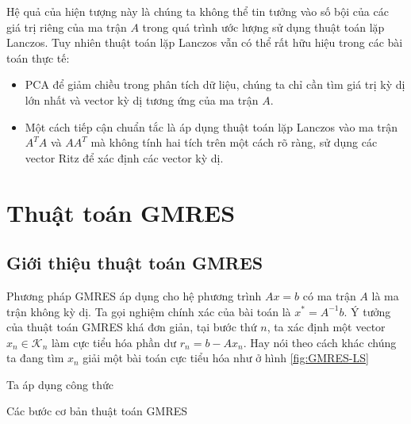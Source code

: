 \documentclass[14pt, a4paper]{article}
\numberwithin{equation}{section}
\numberwithin{algorithm}{section}
\numberwithin{figure}{section}
\numberwithin{dl}{section}
\numberwithin{md}{section}
\numberwithin{bd}{section}
\begin{document}
Hệ quả của hiện tượng này là chúng ta không thể tin tưởng vào số bội của các giá trị riêng của ma trận $A$ trong quá trình ước lượng sử dụng thuật toán lặp Lanczos.
Tuy nhiên thuật toán lặp Lanczos vẫn có thể rất hữu hiệu trong các bài toán thực tế:

\begin{itemize}
    \item PCA để giảm chiều trong phân tích dữ liệu, chúng ta chỉ cần tìm giá trị kỳ dị lớn nhất và vector kỳ dị tương ứng của ma trận $A$.
    \item Một cách tiếp cận chuẩn tắc là áp dụng thuật toán lặp Lanczos vào ma trận $A^T A$ và $A A^T$ mà không tính hai tích trên một cách rõ ràng, sử dụng các vector Ritz để xác định các vector kỳ dị.
\end{itemize}


\section{Thuật toán GMRES}

\subsection{Giới thiệu thuật toán GMRES} \label{GMRES-Introduction}

Phương pháp GMRES áp dụng cho hệ phương trình $Ax=b$ có ma trận $A$ là ma trận không kỳ dị. Ta gọi nghiệm chính xác của bài toán là $x^* = A^{-1}b$. Ý tưởng của thuật toán GMRES khá đơn giản, tại bước thứ $n$, ta xác định một vector $x_n \in \mathcal{K}_n$ làm cực tiểu hóa phần dư $r_n = b - A x_n$. Hay nói theo cách khác chúng ta đang tìm $x_n$ giải một bài toán cực tiểu hóa như ở hình \ref{fig:GMRES-LS}



Ta áp dụng công thức
\begin{algorithm}
    \caption{Các bước cơ bản thuật toán GMRES}\label{alg:GMRES}
    \begin{algorithmic}
        \EndFor
    \end{algorithmic}
\end{algorithm}
\end{document}
